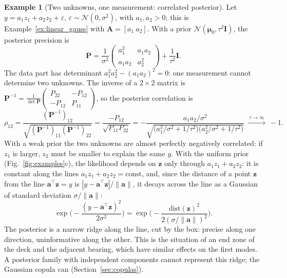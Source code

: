 \documentclass[11pt,a4paper]{article}
\numberwithin{equation}{section}
\theoremstyle{plain}
\theoremstyle{definition}
\newtheorem{example}[proposition]{Example}
\theoremstyle{remark}
\newcommand{\z}{\mathbf{z}}
\newcommand{\aaa}{\mathbf{a}}
\newcommand{\mub}{\bm{\mu}}
\newcommand{\Ab}{\mathbf{A}}
\newcommand{\Pb}{\mathbf{P}}
\newcommand{\I}{\mathbf{I}}
\newcommand{\N}{\mathcal{N}}
\begin{document}
\begin{example}[Two unknowns, one measurement: correlated posterior]
\label{ex:2d}
Let $y=a_1z_1+a_2z_2+\varepsilon$, $\varepsilon\sim\N(0,\sigma^2)$, with $a_1,a_2>0$; this is Example~\ref{ex:linear_gauss} with $\Ab=[a_1\ a_2]$. With a prior $\N(\mub_0,\tau^2\I)$, the posterior precision is
\begin{equation*}
\Pb=\frac1{\sigma^2}\begin{pmatrix}a_1^2&a_1a_2\\a_1a_2&a_2^2\end{pmatrix}+\frac1{\tau^2}\I.
\end{equation*}
The data part has determinant $a_1^2a_2^2-(a_1a_2)^2=0$: one measurement cannot determine two unknowns.
The inverse of a $2\times2$ matrix is $\Pb^{-1}=\frac1{\det\Pb}\begin{pmatrix}P_{22}&-P_{12}\\-P_{12}&P_{11}\end{pmatrix}$, so the posterior correlation is
\begin{equation*}
\rho_{12}=\frac{(\Pb^{-1})_{12}}{\sqrt{(\Pb^{-1})_{11}(\Pb^{-1})_{22}}}=\frac{-P_{12}}{\sqrt{P_{11}P_{22}}}
=-\frac{a_1a_2/\sigma^2}{\sqrt{\big(a_1^2/\sigma^2+1/\tau^2\big)\big(a_2^2/\sigma^2+1/\tau^2\big)}}\ \xrightarrow{\ \tau\to\infty\ }\ -1.
\end{equation*}
With a weak prior the two unknowns are almost perfectly negatively correlated: if $z_1$ is larger, $z_2$ must be smaller to explain the same $y$.
With the uniform prior (Fig.~\ref{fig:examples}c), the likelihood depends on $\z$ only through $a_1z_1+a_2z_2$: it is constant along the lines $a_1z_1+a_2z_2=\text{const}$, and, since the distance of a point $\z$ from the line $\aaa^\top\z=y$ is $|y-\aaa^\top\z|/\|\aaa\|$, it decays across the line as a Gaussian of standard deviation $\sigma/\|\aaa\|$:
\begin{equation*}
\exp\Big(-\frac{(y-\aaa^\top\z)^2}{2\sigma^2}\Big)=\exp\Big(-\frac{\text{dist}(\z)^2}{2(\sigma/\|\aaa\|)^2}\Big).
\end{equation*}
The posterior is a narrow ridge along the line, cut by the box: precise along one direction, uninformative along the other.
This is the situation of an end zone of the deck and the adjacent bearing, which have similar effects on the first modes. A posterior family with independent components cannot represent this ridge; the Gaussian copula can (Section~\ref{sec:copulas}).
\end{example}

\end{document}
